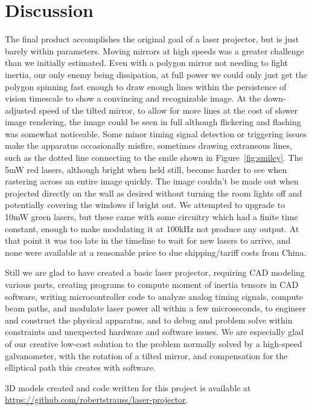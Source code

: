 \documentclass[twocolumn]{revtex4-2}
\begin{document}
\section{Discussion}

The final product accomplishes the original goal of a laser projector, but is just barely within parameters. Moving mirrors at high speeds was a greater challenge than we initially estimated. Even with a polygon mirror not needing to fight inertia, our only enemy being dissipation,  at full power we could only just get the polygon spinning fast enough to draw enough lines within the persistence of vision timescale to show a convincing and recognizable image. At the down-adjusted speed of the tilted mirror, to allow for more lines at the cost of slower image rendering, the image could be seen in full although flickering and flashing was somewhat noticeable. Some minor timing signal detection or triggering issues make the apparatus occasionally misfire, sometimes drawing extraneous lines, such as the dotted line connecting to the smile shown in Figure~\ref{fig:smiley}. The 5mW red lasers, although bright when held still, become harder to see when rastering across an entire image quickly. The image couldn't be made out when projected directly on the wall as desired without turning the room lights off and potentially covering the windows if bright out. We attempted to upgrade to 10mW green lasers, but these came with some circuitry which had a finite time constant, enough to make modulating it at 100kHz not produce any output. At that point it was too late in the timeline to wait for new lasers to arrive, and none were available at a reasonable price to due shipping/tariff costs from China.

Still we are glad to have created a basic laser projector, requiring CAD modeling various parts, creating programs to compute moment of inertia tensors in CAD software, writing microcontroller code to analyze analog timing signals, compute beam paths, and modulate laser power all within a few microseconds, to engineer and construct the physical apparatus, and to debug and problem solve within constraints and unexpected hardware and software issues. We are especially glad of our creative low-cost solution to the problem normally solved by a high-speed galvanometer, with the rotation of a tilted mirror, and compensation for the  elliptical path this creates with software.

3D models created and code written for this project is available at \url{https://github.com/robertstrauss/laser-projector}.
\end{document}
